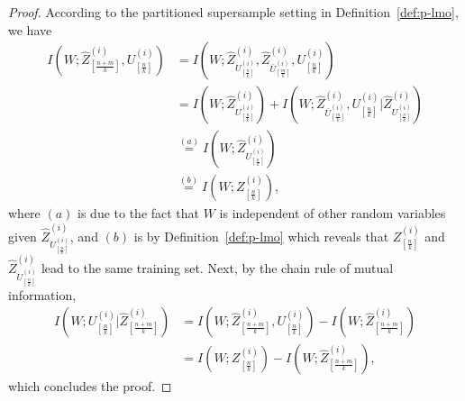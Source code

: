 \documentclass[onecolumn,romanappendices,10pt]{IEEEtran}
\begin{document}
	\begin{proof}
		According to the partitioned supersample setting in Definition~\ref{def:p-lmo}, we have
		\begin{equation}
			\begin{aligned}
				I\left( W; \hat{Z}^{(i)}_{[\frac{n+m}{k}]}, U^{(i)}_{[\frac{n}{k}]} \right) &= I\left( W; \hat{Z}^{(i)}_{U^{(i)}_{[\frac{n}{k}]}}, \hat{Z}^{(i)}_{\bar{U}^{(i)}_{[\frac{m}{k}]}}, U^{(i)}_{[\frac{n}{k}]} \right) \\
				&= I\left( W; \hat{Z}^{(i)}_{U^{(i)}_{[\frac{n}{k}]}} \right) + I\left( W; \hat{Z}^{(i)}_{\bar{U}^{(i)}_{[\frac{m}{k}]}}, U^{(i)}_{[\frac{n}{k}]} | \hat{Z}^{(i)}_{U^{(i)}_{[\frac{n}{k}]}} \right) \\
				& \overset{(a)}{=} I\left( W; \hat{Z}^{(i)}_{U^{(i)}_{[\frac{n}{k}]}} \right) \\
				& \overset{(b)}{=} I\left( W; Z^{(i)}_{[\frac{n}{k}]} \right),
			\end{aligned}
		\end{equation}
		where $(a)$ is due to the fact that $W$ is independent of other random variables given $\hat{Z}^{(i)}_{U^{(i)}_{[\frac{n}{k}]}}$, and $(b)$ is by Definition~\ref{def:p-lmo} which reveals that $Z^{(i)}_{[\frac{n}{k}]}$ and $\hat{Z}^{(i)}_{U^{(i)}_{[\frac{n}{k}]}}$ lead to the same training set. Next, by the chain rule of mutual information,
		\begin{equation}
			\begin{aligned}
				I\left( W; U^{(i)}_{[\frac{n}{k}]} | \hat{Z}^{(i)}_{[\frac{n+m}{k}]} \right) &= I\left( W; \hat{Z}^{(i)}_{[\frac{n+m}{k}]}, U^{(i)}_{[\frac{n}{k}]} \right) - I\left( W; \hat{Z}^{(i)}_{[\frac{n+m}{k}]} \right) \\
				&= I\left( W; Z^{(i)}_{[\frac{n}{k}]} \right) - I\left( W; \hat{Z}^{(i)}_{[\frac{n+m}{k}]} \right),
			\end{aligned}
		\end{equation}
		which concludes the proof.
	\end{proof}
	
\end{document}
